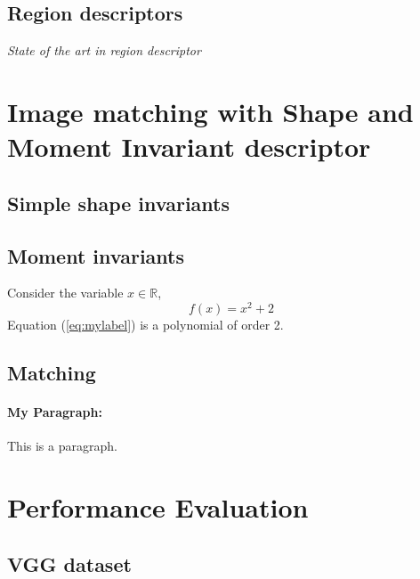 \documentclass[a4paper,11pt]{article}
\begin{document}
\subsection{Region descriptors}
{\em State of the art in region descriptor}

\section{Image matching with Shape and Moment Invariant descriptor}

\subsection{Simple shape invariants}
\subsection{Moment invariants}
Consider the variable $x \in \mathbb{R}$, 
\begin{equation}
f(x)=x^2+2 \label{eq:mylabel}
\end{equation}
Equation (\ref{eq:mylabel}) is a polynomial of order 2.

\subsection{Matching}

\paragraph{My Paragraph:} 
This is a paragraph. 

\section{Performance Evaluation}

\subsection{VGG dataset}

\end{document}
